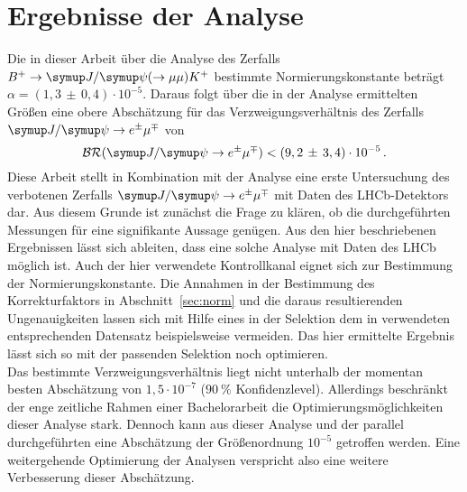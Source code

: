 \chapter{Ergebnisse der Analyse}
\label{chap:5}
%
Die in dieser Arbeit über die Analyse des Zerfalls $B^{+}\rightarrow\jpsi(\rightarrow\mu\mu) K^{+}$ bestimmte Normierungskonstante beträgt $\alpha=(1,3\,\pm\,0,4)\cdot10^{-5}$. Daraus folgt über die in der Analyse \cite{ba-maik} ermittelten Größen eine obere Abschätzung für das Verzweigungsverhältnis des Zerfalls $\signal$ von
%
\begin{equation}
  \mathcal{BR}(\signal)<(9,2\,\pm\,3,4)\cdot10^{-5} \, .
  \label{eq:ergebnisss}
\end{equation}
%
Diese Arbeit stellt in Kombination mit der Analyse \cite{ba-maik} eine erste Untersuchung des verbotenen Zerfalls $\signal$ mit
Daten des LHCb-Detektors dar. Aus diesem Grunde ist zunächst die Frage zu klären, ob die durchgeführten Messungen für eine signifikante
Aussage genügen. Aus den hier beschriebenen Ergebnissen lässt sich ableiten, dass eine solche Analyse mit Daten des LHCb möglich ist. Auch der hier verwendete Kontrollkanal eignet sich zur Bestimmung der Normierungskonstante. Die Annahmen in der Bestimmung des Korrekturfaktors in Abschnitt~\ref{sec:norm} und die daraus resultierenden Ungenauigkeiten lassen sich mit Hilfe eines in der Selektion dem in \cite{ba-maik} verwendeten entsprechenden Datensatz beispielsweise vermeiden. Das hier ermittelte Ergebnis lässt sich so mit der passenden Selektion noch optimieren.\\
Das bestimmte Verzweigungsverhältnis liegt nicht unterhalb der momentan besten Abschätzung \cite{BESIII} von $1,5\cdot10^{-7}$ ($\SI{90}{\percent}$ Konfidenzlevel). Allerdings beschränkt der enge zeitliche Rahmen einer Bachelorarbeit die Optimierungsmöglichkeiten dieser Analyse stark. Dennoch kann aus dieser Analyse und der parallel durchgeführten \cite{ba-maik} eine Abschätzung der Größenordnung $10^{-5}$ getroffen werden. Eine weitergehende Optimierung der Analysen verspricht also eine weitere Verbesserung dieser Abschätzung.
%
